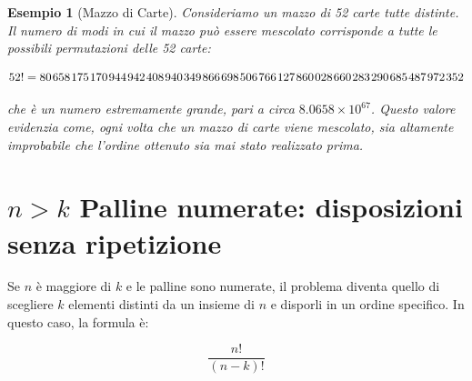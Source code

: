 \documentclass[
  11pt,
]{book}
\theoremstyle{mytheoremstyle}
\theoremstyle{mydefstyle}
\newtheorem{example}{{Esempio}}[section]
\begin{document}
\begin{example}[Mazzo di Carte]
Consideriamo un mazzo di 52 carte tutte distinte. Il numero di modi in cui il mazzo può essere mescolato corrisponde a tutte le possibili permutazioni delle 52 carte:

\[
52! = \scriptsize 80\hspace{0.9pt}658\hspace{0.9pt}175\hspace{0.9pt}170\hspace{0.9pt}944\hspace{0.9pt}942\hspace{0.9pt}408\hspace{0.9pt}940\hspace{0.9pt}349\hspace{0.9pt}866\hspace{0.9pt}698\hspace{0.9pt}506\hspace{0.9pt}766\hspace{0.9pt}127\hspace{0.9pt}860\hspace{0.9pt}028\hspace{0.9pt}660\hspace{0.9pt}283\hspace{0.9pt}290\hspace{0.9pt}685\hspace{0.9pt}487\hspace{0.9pt}972\hspace{0.9pt}352
\]

che è un numero estremamente grande, pari a circa \(8.0658 \times 10^{67}\). Questo valore evidenzia come, ogni volta che un mazzo di carte viene mescolato, sia altamente improbabile che l'ordine ottenuto sia mai stato realizzato prima.
\end{example}

\section{\texorpdfstring{\(n > k\) Palline numerate: disposizioni senza ripetizione}{n \textgreater{} k Palline numerate: disposizioni senza ripetizione}}\label{n-k-palline-numerate-disposizioni-senza-ripetizione}

Se \(n\) è maggiore di \(k\) e le palline sono numerate, il problema diventa quello di scegliere \(k\) elementi distinti da un insieme di \(n\) e disporli in un ordine specifico. In questo caso, la formula è:

\[
\frac{n!}{(n-k)!}
\]
\end{document}
